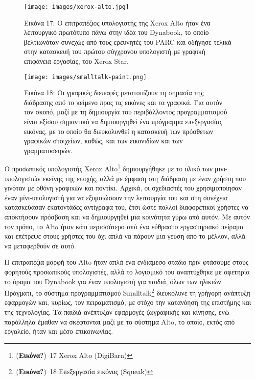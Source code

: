 \documentclass[
]{article}
\begin{document}
\leavevmode{}%
\begin{figure}
\hypertarget{fig:xerox-alto}{%
\centering
\texttt{[image: images/xerox-alto.jpg]}
\caption{Εικόνα 17: Ο επιτραπέζιος υπολογιστής της Xerox Alto ήταν ένα
λειτουργικό πρωτότυπο πάνω στην ιδέα του Dynabook, το οποίο βελτιωνόταν
συνεχώς από τους ερευνητές του PARC και οδήγησε τελικά στην κατασκευή
του πρώτου σύγχρονου υπολογιστή με γραφική επιφάνεια εργασίας, του Xerox
Star.}\label{fig:xerox-alto}
}
\end{figure}

\leavevmode{}%
\begin{figure}
\hypertarget{fig:smalltalk-paint}{%
\centering
\texttt{[image: images/smalltalk-paint.png]}
\caption{Εικόνα 18: Οι γραφικές διεπαφές μετατοπίζουν τη σημασία της
διάδρασης από το κείμενο προς τις εικόνες και τα γραφικά. Για αυτόν τον
σκοπό, μαζί με τη δημιουργία του περιβάλλοντος προγραμματισμού είναι
εξίσου σημαντικό να δημιουργηθεί ένα πρόγραμμα επεξεργασίας εικόνας, με
το οποίο θα διευκολυνθεί η κατασκευή των πρόσθετων γραφικών στοιχείων,
καθώς, και των εικονιδίων και των
γραμματοσειρών.}\label{fig:smalltalk-paint}
}
\end{figure}

Ο προσωπικός υπολογιστής Xerox Alto\footnote{(\textbf{Εικόνα?})~17 Xerox
  Alto (DigiBarn)} δημιουργήθηκε με το υλικό των μινι-υπολογιστών
εκείνης της εποχής, αλλά με έμφαση στη διάδραση με έναν χρήστη που
γινόταν με οθόνη γραφικών και ποντίκι. Αρχικά, οι σχεδιαστές του
χρησιμοποίησαν έναν μίνι-υπολογιστή για να εξομοιώσουν την λειτουργία
του και στη συνέχεια κατασκεύασαν εκατοντάδες αντίγραφα του, έτσι ώστε
πολλοί διαφορετικοί χρήστες να αποκτήσουν πρόσβαση και να δημιουργηθεί
μια κοινότητα γύρω από αυτόν. Με αυτόν τον τρόπο, το Alto ήταν κάτι
περισσότερο από ένα εύθραστο εργαστηριακό πείραμα και επέτρεψε στους
χρήστες του όχι απλά να πάρουν μια γεύση από το μέλλον, αλλά να
μεταφερθούν σε αυτό.

Η επιτραπέζια μορφή του Alto ήταν απλά ένα ενδιάμεσο στάδιο πριν
φτάσουμε στους φορητούς προσωπικούς υπολογιστές, αλλά το λογισμικό του
αναπτύχθηκε με αφετηρία το όραμα του Dynabook για έναν υπολογιστή για
παιδιά, όλων των ηλικιών. Πράγματι, το σύστημα προγραμματισμού
Smalltalk\footnote{(\textbf{Εικόνα?})~18 Eπεξεργασία εικόνας (Squeak)}
διευκόλυνε τη γρήγορη ανάπτυξη εφαρμογών και, κυρίως, τον πειραματισμό,
με στόχο την κατανόηση της επιστήμης και της τεχνολογίας. Τα παιδιά
ανέπτυξαν εφαρμογές ζωγραφικής και κίνησης, ενώ παράλληλα έμαθαν να
σκέφτονται μαζί με το σύστημα Alto, το οποίο, εκτός από εργαλείο, ήταν
και μέσο επικοινωνίας.
\end{document}
